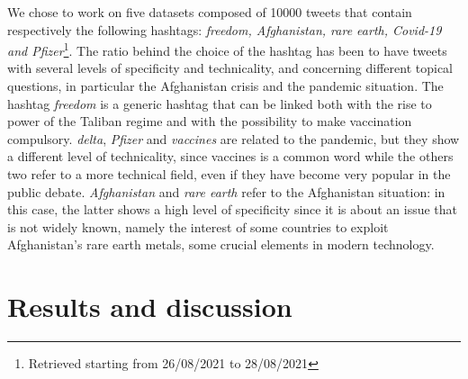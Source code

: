 \documentclass[12pt,%
               a4paper,%
               oneside,openany,%
               titlepage,%
               headinclude,footinclude,%
               BCOR5mm,%
               cleardoublepage=empty,%
               tablecaptionabove,%
               floatperchapter,
               ]{scrreprt}                 %
\begin{document}
We chose to work on five datasets composed of 10000 tweets that contain respectively the following hashtags: \textit{freedom, Afghanistan, rare earth, Covid-19 and Pfizer}\footnote{Retrieved starting from 26/08/2021 to 28/08/2021}.  The ratio behind the choice of the hashtag has been to have tweets with several levels of specificity and technicality, and concerning different topical questions, in particular the Afghanistan crisis and the pandemic situation. The hashtag \textit{freedom} is a generic hashtag that can be linked both with the rise to power of the Taliban regime and with the possibility to make vaccination compulsory.  \textit{delta}, \textit{Pfizer} and \textit{vaccines} are related to the pandemic,  but they show a different level of technicality, since vaccines is a common word while the others two refer to a more technical field, even if they have become very popular in the public debate.  \textit{Afghanistan} and \textit{rare earth } refer to the Afghanistan situation: in this case, the latter shows a high level of specificity since it is about an issue that is not widely known, namely the interest of some countries to exploit Afghanistan’s rare earth metals, some crucial elements in modern technology.


\chapter{Results and discussion}
\end{document}

